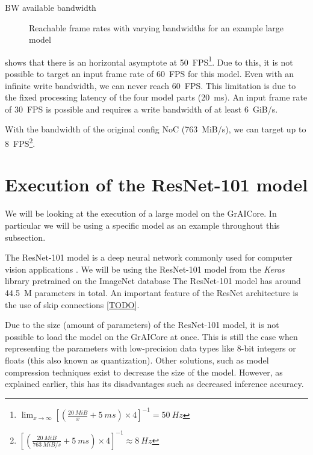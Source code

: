 \begin{eqexpl}[15mm]
    \item{$\textrm{BW}$} available bandwidth
\end{eqexpl}

\begin{figure}
    \centering
    
    \caption{Reachable frame rates with varying bandwidths for an example large model}
    \label{fig:large_model_bandwidth_analysis_example}
\end{figure}

 shows that there is an horizontal asymptote at \SI{50}{FPS}\footnote{ $\lim_{x \to \infty} \left[ \left( \frac{\SI{20}{MiB}}{x} + \SI{5}{ms} \right) \times 4 \right]^{-1} = \SI{50}{Hz}$}.
Due to this, it is not possible to target an input frame rate of \SI{60}{FPS} for this model.
Even with an infinite write bandwidth, we can never reach \SI{60}{FPS}.
This limitation is due to the fixed processing latency of the four model parts (\SI{20}{ms}).
An input frame rate of \SI{30}{FPS} is possible and requires a write bandwidth of at least \SI{6}{GiB/s}.

With the bandwidth of the original config NoC (\SI{763}{MiB/s}), we can target up to \SI{8}{FPS}\footnote{$\left[ \left( \frac{\SI{20}{MiB}}{\SI{763}{MiB/s}} + \SI{5}{ms} \right) \times 4 \right]^{-1} \approx \SI{8}{Hz}$}.
 
\section{Execution of the ResNet-101 model}
We will be looking at the execution of a large model on the GrAICore.
In particular we will be using a specific model as an example throughout this subsection.

The ResNet-101 model is a deep neural network commonly used for computer vision applications \cite{heDeepResidualLearning2015}.
We will be using the ResNet-101 model from the \textit{Keras} library \cite{KerasDocumentationResNet} pretrained on the ImageNet database \cite{russakovskyImageNetLargeScale2014}
The ResNet-101 model has around \SI{44.5}{M} parameters in total.
An important feature of the ResNet architecture is the use of skip connections \cref{TODO}.

Due to the size (amount of parameters) of the ResNet-101 model, it is not possible to load the model on the GrAICore at once.
This is still the case when representing the parameters with low-precision data types like 8-bit integers or floats (this also known as quantization).
Other solutions, such as model compression techniques exist to decrease the size of the model.
However, as explained earlier, this has its disadvantages such as decreased inference accuracy.


